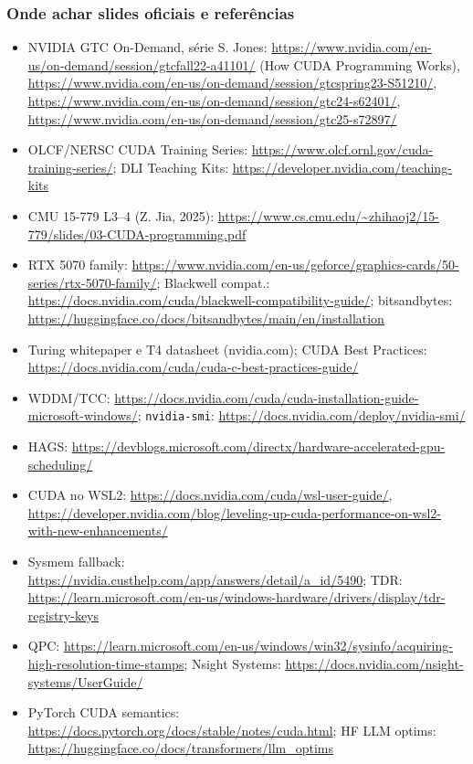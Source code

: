\documentclass[11pt, aspectratio=169, usepdftitle=false]{beamer}
\begin{document}
\begin{frame}
\frametitle{Onde achar slides oficiais e referências}
\tiny{}
\begin{itemize}
\item NVIDIA GTC On-Demand, série S. Jones: \url{https://www.nvidia.com/en-us/on-demand/session/gtcfall22-a41101/} (How CUDA Programming Works), \url{https://www.nvidia.com/en-us/on-demand/session/gtcspring23-S51210/}, \url{https://www.nvidia.com/en-us/on-demand/session/gtc24-s62401/}, \url{https://www.nvidia.com/en-us/on-demand/session/gtc25-s72897/}
\item OLCF/NERSC CUDA Training Series: \url{https://www.olcf.ornl.gov/cuda-training-series/}; DLI Teaching Kits: \url{https://developer.nvidia.com/teaching-kits}
\item CMU 15-779 L3--4 (Z. Jia, 2025): \url{https://www.cs.cmu.edu/~zhihaoj2/15-779/slides/03-CUDA-programming.pdf}
\item RTX 5070 family: \url{https://www.nvidia.com/en-us/geforce/graphics-cards/50-series/rtx-5070-family/}; Blackwell compat.: \url{https://docs.nvidia.com/cuda/blackwell-compatibility-guide/}; bitsandbytes: \url{https://huggingface.co/docs/bitsandbytes/main/en/installation}
\item Turing whitepaper e T4 datasheet (nvidia.com); CUDA Best Practices: \url{https://docs.nvidia.com/cuda/cuda-c-best-practices-guide/}
\item WDDM/TCC: \url{https://docs.nvidia.com/cuda/cuda-installation-guide-microsoft-windows/}; \texttt{nvidia-smi}: \url{https://docs.nvidia.com/deploy/nvidia-smi/}
\item HAGS: \url{https://devblogs.microsoft.com/directx/hardware-accelerated-gpu-scheduling/}
\item CUDA no WSL2: \url{https://docs.nvidia.com/cuda/wsl-user-guide/}, \url{https://developer.nvidia.com/blog/leveling-up-cuda-performance-on-wsl2-with-new-enhancements/}
\item Sysmem fallback: \url{https://nvidia.custhelp.com/app/answers/detail/a_id/5490}; TDR: \url{https://learn.microsoft.com/en-us/windows-hardware/drivers/display/tdr-registry-keys}
\item QPC: \url{https://learn.microsoft.com/en-us/windows/win32/sysinfo/acquiring-high-resolution-time-stamps}; Nsight Systems: \url{https://docs.nvidia.com/nsight-systems/UserGuide/}
\item PyTorch CUDA semantics: \url{https://docs.pytorch.org/docs/stable/notes/cuda.html}; HF LLM optims: \url{https://huggingface.co/docs/transformers/llm_optims}
\end{itemize}
\end{frame}

\lastslide
\end{document}
